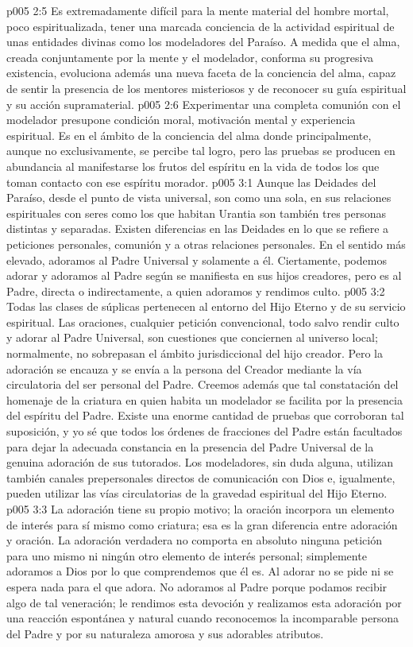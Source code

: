 \vs p005 2:5 Es extremadamente difícil para la mente material del hombre mortal, poco espiritualizada, tener una marcada conciencia de la actividad espiritual de unas entidades divinas como los modeladores del Paraíso. A medida que el alma, creada conjuntamente por la mente y el modelador, conforma su progresiva existencia, evoluciona además una nueva faceta de la conciencia del alma, capaz de sentir la presencia de los mentores misteriosos y de reconocer su guía espiritual y su acción supramaterial.
\vs p005 2:6 Experimentar una completa comunión con el modelador presupone condición moral, motivación mental y experiencia espiritual. Es en el ámbito de la conciencia del alma donde principalmente, aunque no exclusivamente, se percibe tal logro, pero las pruebas se producen en abundancia al manifestarse los frutos del espíritu en la vida de todos los que toman contacto con ese espíritu morador.
\vs p005 3:1 Aunque las Deidades del Paraíso, desde el punto de vista universal, son como una sola, en sus relaciones espirituales con seres como los que habitan Urantia son también tres personas distintas y separadas. Existen diferencias en las Deidades en lo que se refiere a peticiones personales, comunión y a otras relaciones personales. En el sentido más elevado, adoramos al Padre Universal y solamente a él. Ciertamente, podemos adorar y adoramos al Padre según se manifiesta en sus hijos creadores, pero es al Padre, directa o indirectamente, a quien adoramos y rendimos culto.
\vs p005 3:2 Todas las clases de súplicas pertenecen al entorno del Hijo Eterno y de su servicio espiritual. Las oraciones, cualquier petición convencional, todo salvo rendir culto y adorar al Padre Universal, son cuestiones que conciernen al universo local; normalmente, no sobrepasan el ámbito jurisdiccional del hijo creador. Pero la adoración se encauza y se envía a la persona del Creador mediante la vía circulatoria del ser personal del Padre. Creemos además que tal constatación del homenaje de la criatura en quien habita un modelador se facilita por la presencia del espíritu del Padre. Existe una enorme cantidad de pruebas que corroboran tal suposición, y yo sé que todos los órdenes de fracciones del Padre están facultados para dejar la adecuada constancia en la presencia del Padre Universal de la genuina adoración de sus tutorados. Los modeladores, sin duda alguna, utilizan también canales prepersonales directos de comunicación con Dios e, igualmente, pueden utilizar las vías circulatorias de la gravedad espiritual del Hijo Eterno.
\vs p005 3:3 La adoración tiene su propio motivo; la oración incorpora un elemento de interés para sí mismo como criatura; esa es la gran diferencia entre adoración y oración. La adoración verdadera no comporta en absoluto ninguna petición para uno mismo ni ningún otro elemento de interés personal; simplemente adoramos a Dios por lo que comprendemos que él es. Al adorar no se pide ni se espera nada para el que adora. No adoramos al Padre porque podamos recibir algo de tal veneración; le rendimos esta devoción y realizamos esta adoración por una reacción espontánea y natural cuando reconocemos la incomparable persona del Padre y por su naturaleza amorosa y sus adorables atributos.
